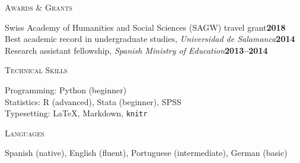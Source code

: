 \documentclass[a4paper, 10pt]{article}
\begin{document}
\noindent
\begin{minipage}[t]{0.13\textwidth}
  \flushleft
  \textsc{\footnotesize Awards \& Grants}
\end{minipage}
\begin{minipage}[t]{0.87\textwidth}
  Swiss Academy of Humanities and Social Sciences (SAGW) travel grant\hfill{\bf 2018}\\
  Best academic record in undergraduate studies, {\it Universidad de Salamanca}\hfill{\bf 2014}\\
  Research assistant fellowship, {\it Spanish Ministry of Education}\hfill{\bf 2013--2014}
\end{minipage}

\vspace{8pt}



\noindent
\begin{minipage}[t]{0.13\textwidth}
  \flushleft
  \textsc{\footnotesize Technical Skills}
\end{minipage}
\begin{minipage}[t]{0.87\textwidth}
  Programming: Python (beginner)\\
  Statistics: R (advanced), Stata (beginner), SPSS\\
  Typesetting: \LaTeX, Markdown, {\tt knitr}\\
\end{minipage}

\vspace{8pt}


\noindent
\begin{minipage}[t]{0.13\textwidth}
  \flushleft
  \textsc{\footnotesize Languages}
\end{minipage}
\begin{minipage}[t]{0.87\textwidth}
  Spanish (native),
  English (fluent),
  Portuguese (intermediate),
  German (basic)
\end{minipage}

\vspace{5pt}

\end{document}
